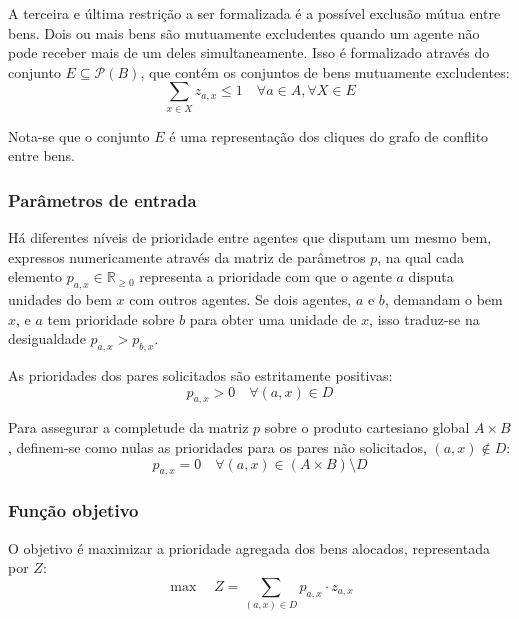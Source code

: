\documentclass[
    12pt,
    openany,
    oneside,
    a4paper,
    english,
    brazil
]{abntex2}
\begin{document}
A terceira e última restrição a ser formalizada é a possível exclusão mútua entre bens. Dois ou mais bens são mutuamente excludentes quando um agente não pode receber mais de um deles simultaneamente. Isso é formalizado através do conjunto $E \subseteq \mathcal{P}(B)$, que contém os conjuntos de bens mutuamente excludentes:
\begin{equation} \label{eq:exclusao}
    \sum_{x \in X} z_{a, x} \leq 1 \quad \forall a \in A, \forall X \in E
\end{equation}

Nota-se que o conjunto $E$ é uma representação dos cliques do grafo de conflito entre bens.

\subsubsection{Parâmetros de entrada}

Há diferentes níveis de prioridade entre agentes que disputam um mesmo bem, expressos numericamente através da matriz de parâmetros $p$, na qual cada elemento $p_{a, x} \in \mathbb{R}_{\geq0}$ representa a prioridade com que o agente $a$ disputa unidades do bem $x$ com outros agentes. Se dois agentes, $a$ e $b$, demandam o bem $x$, e $a$ tem prioridade sobre $b$ para obter uma unidade de $x$, isso traduz-se na desigualdade $p_{a,x} > p_{b, x}$.

As prioridades dos pares solicitados são estritamente positivas:
\begin{equation} \label{eq:prioridade-positiva}
    p_{a, x} > 0 \quad \forall (a, x) \in D
\end{equation}

Para assegurar a completude da matriz $p$ sobre o produto cartesiano global $A \times B$, definem-se como nulas as prioridades para os pares não solicitados,  $(a, x) \notin D$:
\begin{equation} \label{eq:p-igual-zero}
    p_{a, x} = 0 \quad \forall (a, x) \in (A \times B) \setminus D
\end{equation}

\subsubsection{Função objetivo}
\label{sec:funcao-objetivo}

O objetivo é maximizar a prioridade agregada dos bens alocados, representada por $Z$:
\begin{equation} \label{eq:objetivo}
    \max \quad Z = \sum_{(a, x)\in D}  p_{a, x} \cdot z_{a, x}
\end{equation}
\end{document}
